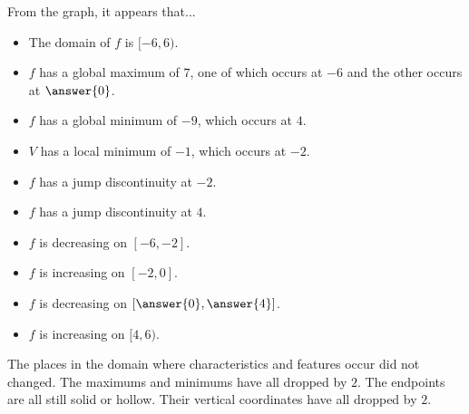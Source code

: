 \documentclass{ximera}
\begin{document}
\begin{example}
\begin{image}
\end{image}





From the graph, it appears that... \\

\begin{itemize}

\item The domain of $f$ is $[-6,6)$.
\item $f$ has a global maximum of $7$, one of which occurs at $-6$ and the other occurs at $\answer{0}$.
\item $f$ has a global minimum of $-9$, which occurs at $4$.
\item $V$ has a local minimum of $-1$, which occurs at $-2$.
\item $f$ has a jump discontinuity at $-2$.
\item $f$ has a jump discontinuity at $4$.
\item $f$ is decreasing on $[-6, -2]$.
\item $f$ is increasing on $[-2, 0]$.
\item $f$ is decreasing on $\left[\answer{0}, \answer{4}\right]$.
\item $f$ is increasing on $[4, 6)$.


\end{itemize}



The places in the domain where characteristics and features occur did not changed.  The maximums and minimums have all dropped by $2$.  The endpoints are all still solid or hollow.  Their vertical coordinates have all dropped by $2$.






\end{example}
\end{document}
